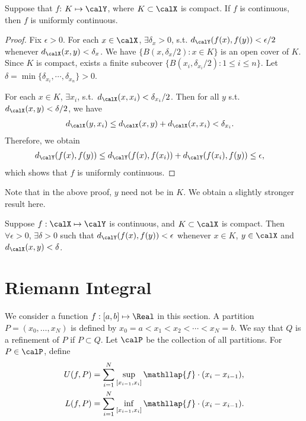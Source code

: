 \documentclass[../aipt.tex]{subfiles}
\begin{document}
\begin{Lemma}
Suppose that $f$: $K \mapsto \calY$, where $K \subset \calX$ is compact. If $f$ is continuous, then $f$ is uniformly continuous.
\end{Lemma}
\begin{proof}
Fix $\epsilon>0$. For each $x \in \calX$, $\exists \delta_x>0$, s.t. $d_{\calY}(f(x),f(y))< \epsilon/2$ whenever $d_{\calX}(x,y)<\delta_x$. We have $\{B(x,\delta_x/2) : x\in K\}$ is an open cover of $K$. Since $K$ is compact, exists a finite subcover $\{B(x_i,\delta_{x_i}/2): 1\leq i \leq n\}$. Let $\delta= \min\{\delta_{x_i},\cdots, \delta_{x_n}\}>0$. 

For each $x \in K$, $\exists x_i$, s.t.\ $d_{\calX}(x,x_i)<\delta_{x_i}/2$. Then for all $y$ s.t.\ $d_{\calX}(x,y)<\delta/2$, we have 
\begin{align*}
d_{\calX}(y,x_i) &\leq d_{\calX}(x,y)+d_{\calX}(x,x_i)<\delta_{x_i}.
\end{align*}
Therefore, we obtain
\begin{align*}
d_{\calY}(f(x),f(y))&\leq d_{\calY}(f(x),f(x_i))+d_{\calY}(f(x_i),f(y)) \leq \epsilon,
\end{align*}
which shows that $f$ is uniformly continuous.
\end{proof}

Note that in the above proof, $y$ need not be in $K$. We obtain a slightly stronger result here.

\begin{Corollary}\label{wk2:f_K_compact}
Suppose $f:\calX\mapsto\calY$ is continuous, and $K\subset\calX$ is compact. Then $\forall \epsilon>0$, $\exists \delta>0$ such that $d_{\calY}(f(x),f(y))< \epsilon$ whenever $x \in K$, $y \in \calX$ and  $d_{\calX}(x,y)< \delta$.
\end{Corollary}

\section{Riemann Integral}

We consider a function $f:[a,b]\mapsto\Real$ in this section. A partition $P=(x_0,\ldots,x_N)$ is defined by $x_0=a<x_1<x_2<\cdots<x_N=b$. We say that $Q$ is a refinement of $P$ if $P\subset Q$. Let $\calP$ be the collection of all partitions. For $P\in\calP$, define
\begin{align*}
U(f,P)&=\sum_{i=1}^N\sup_{[x_{i-1},x_i]}\mathllap{f}\cdot(x_i-x_{i-1}), \\
L(f,P)&=\sum_{i=1}^N\inf_{[x_{i-1},x_i]}\mathllap{f}\cdot(x_i-x_{i-1}). 
\end{align*}
\end{document}
